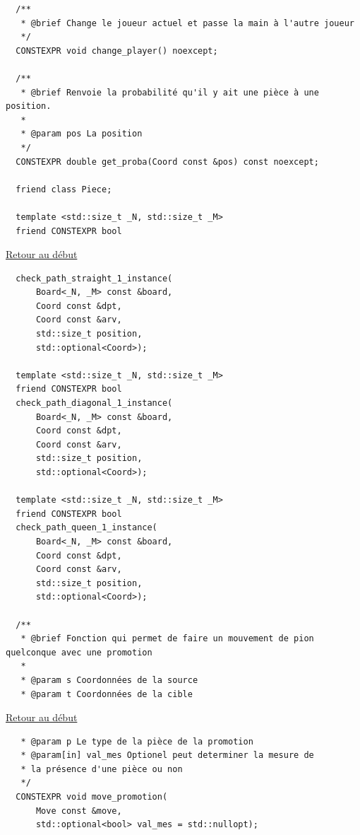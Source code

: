 {\begin{frame}[fragile]
\begin{verbatim}
  /**
   * @brief Change le joueur actuel et passe la main à l'autre joueur
   */
  CONSTEXPR void change_player() noexcept;

  /**
   * @brief Renvoie la probabilité qu'il y ait une pièce à une position.
   *
   * @param pos La position
   */
  CONSTEXPR double get_proba(Coord const &pos) const noexcept;

  friend class Piece;

  template <std::size_t _N, std::size_t _M>
  friend CONSTEXPR bool
\end{verbatim}
\end{frame}

\begin{frame}[fragile]
\hyperlink{conclusion}{Retour au début}\newline
\begin{verbatim}
  check_path_straight_1_instance(
      Board<_N, _M> const &board,
      Coord const &dpt,
      Coord const &arv,
      std::size_t position,
      std::optional<Coord>);

  template <std::size_t _N, std::size_t _M>
  friend CONSTEXPR bool
  check_path_diagonal_1_instance(
      Board<_N, _M> const &board,
      Coord const &dpt,
      Coord const &arv,
      std::size_t position,
      std::optional<Coord>);

  template <std::size_t _N, std::size_t _M>
  friend CONSTEXPR bool
  check_path_queen_1_instance(
      Board<_N, _M> const &board,
      Coord const &dpt,
      Coord const &arv,
      std::size_t position,
      std::optional<Coord>);

  /**
   * @brief Fonction qui permet de faire un mouvement de pion quelconque avec une promotion
   *
   * @param s Coordonnées de la source
   * @param t Coordonnées de la cible
\end{verbatim}
\end{frame}

\begin{frame}[fragile]
\hyperlink{conclusion}{Retour au début}\newline
\begin{verbatim}
   * @param p Le type de la pièce de la promotion
   * @param[in] val_mes Optionel peut determiner la mesure de
   * la présence d'une pièce ou non
   */
  CONSTEXPR void move_promotion(
      Move const &move,
      std::optional<bool> val_mes = std::nullopt);


\end{verbatim}
\end{frame}}
